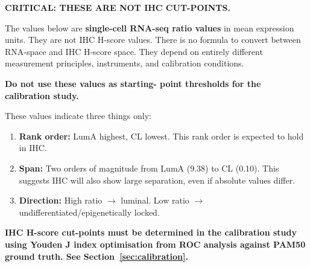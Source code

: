 \documentclass[11pt, a4paper]{article}
\begin{document}
\begin{mdframed}[backgroundcolor=criticalbox,
                 linecolor=red!60!black,
                 linewidth=1.5pt]
\textbf{CRITICAL: THESE ARE NOT IHC CUT-POINTS.}

The values below are \textbf{single-cell
RNA-seq ratio values} in mean expression
units. They are not IHC H-score values.
There is no formula to convert between
RNA-space and IHC H-score space. They
depend on entirely different measurement
principles, instruments, and calibration
conditions.

\textbf{Do not use these values as starting-
point thresholds for the calibration study.}

These values indicate three things only:
\begin{enumerate}[noitemsep]
    \item \textbf{Rank order:} LumA highest,
    CL lowest. This rank order is expected
    to hold in IHC.
    \item \textbf{Span:} Two orders of
    magnitude from LumA (9.38) to CL (0.10).
    This suggests IHC will also show large
    separation, even if absolute values differ.
    \item \textbf{Direction:} High ratio
    $\rightarrow$ luminal. Low ratio
    $\rightarrow$ undifferentiated/epigenetically
    locked.
\end{enumerate}

\textbf{IHC H-score cut-points must be
determined in the calibration study using
Youden J index optimisation from ROC analysis
against PAM50 ground truth. See
Section~\ref{sec:calibration}.}
\end{mdframed}

\vspace{0.5em}
\end{document}
